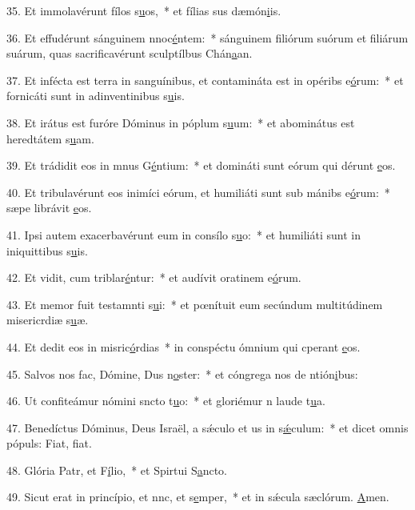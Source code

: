 35. Et immolavérunt fílos s\uline{u}os,~* et fílias sus dæmón\uline{i}is.\par 
36. Et effudérunt sánguinem nnoc\uline{é}ntem:~* sánguinem filiórum suórum et filiárum suárum, quas sacrificavérunt sculptílbus Chán\uline{a}an.\par 
37. Et infécta est terra in sanguínibus, et contamináta est in opéribs e\uline{ó}rum:~* et fornicáti sunt in adinventinibus s\uline{u}is.\par 
38. Et irátus est furóre Dóminus in póplum s\uline{u}um:~* et abominátus est heredtátem s\uline{u}am.\par 
39. Et trádidit eos in mnus G\uline{é}ntium:~* et domináti sunt eórum qui dérunt \uline{e}os.\par 
40. Et tribulavérunt eos inimíci eórum, et humiliáti sunt sub mánibs e\uline{ó}rum:~* sæpe librávit \uline{e}os.\par 
41. Ipsi autem exacerbavérunt eum in consílo s\uline{u}o:~* et humiliáti sunt in iniquittibus s\uline{u}is.\par 
42. Et vidit, cum triblar\uline{é}ntur:~* et audívit oratinem e\uline{ó}rum.\par 
43. Et memor fuit testamnti s\uline{u}i:~* et pœnítuit eum secúndum multitúdinem misericrdiæ s\uline{u}æ.\par 
44. Et dedit eos in misric\uline{ó}rdias~* in conspéctu ómnium qui cperant \uline{e}os.\par 
45. Salvos nos fac, Dómine, Dus n\uline{o}ster:~* et cóngrega nos de ntión\uline{i}bus:\par 
46. Ut confiteámur nómini sncto t\uline{u}o:~* et gloriémur n laude t\uline{u}a.\par 
47. Benedíctus Dóminus, Deus Israël, a sǽculo et us in s\uline{ǽ}culum:~* et dicet omnis pópuls: Fiat, f\uline{i}at.\par 
48. Glória Patr, et F\uline{í}lio,~* et Spirtui S\uline{a}ncto.\par 
49. Sicut erat in princípio, et nnc, et s\uline{e}mper,~* et in sǽcula sæclórum. \uline{A}men.\par 
